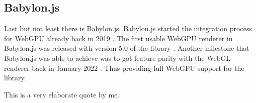 \subsection{Babylon.js}

Last but not least there is Babylon.js.
Babylon.js started the integration process for WebGPU already back in 2019 \cite{babylon_start_webgpu}. 
The first usable WebGPU renderer in Babylon.js was released with version 5.0 of the library \cite{babylon_released}.
Another milestone that Babylon.js was able to achieve was to got feature parity with the WebGL renderer back in January 2022 \cite{babylon_parity}.
Thus providing full WebGPU support for the library.


\begin{displayquote}
  This is a very elaborate quote by me.
\end{displayquote}
